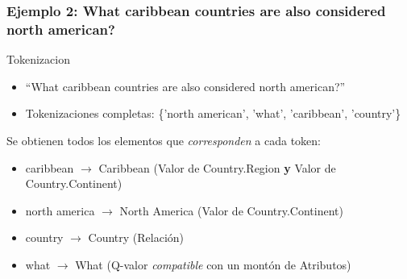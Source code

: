 \begin{frame}[<+->]
\frametitle{Ejemplo 2: What caribbean countries are also considered north american?}
  Tokenizacion
  \begin{itemize}
    \item ``What caribbean countries are also considered north american?''
    \item Tokenizaciones completas: \{'north american', 'what', 'caribbean', 'country'\}
  \end{itemize}

  Se obtienen todos los elementos que \textit{corresponden} a cada token:
   \small{
  \begin{itemize}

    \item caribbean $\rightarrow$ Caribbean (Valor de Country.Region \textbf{y} Valor de Country.Continent)
    \item north america $\rightarrow$ North America (Valor de Country.Continent)
    \item country $\rightarrow$ Country (Relación)
    \item what $\rightarrow$ What (Q-valor \textit{compatible} con un montón de Atributos)
    
  \end{itemize}
  }
  
\end{frame}


